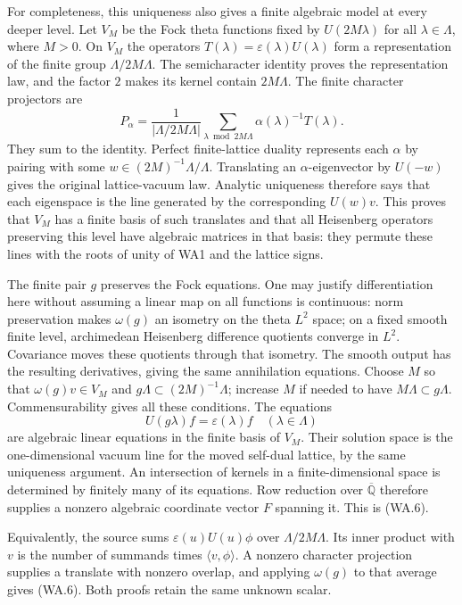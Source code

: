 For completeness, this uniqueness also gives a finite algebraic
model at every deeper level.  Let $V_M$ be the Fock theta functions
fixed by $U(2M\lambda)$ for all $\lambda\in\Lambda$, where $M>0$.
On $V_M$ the operators
$T(\lambda)=\varepsilon(\lambda)U(\lambda)$ form a representation
of the finite group $\Lambda/2M\Lambda$.  The semicharacter identity
proves the representation law, and the factor $2$ makes its kernel
contain $2M\Lambda$.  The finite character projectors are
\[
  P_\alpha=\frac1{|\Lambda/2M\Lambda|}
       \sum_{\lambda\bmod 2M\Lambda}
                          \alpha(\lambda)^{-1}T(\lambda).   \tag{WA.7}
\]
They sum to the identity.  Perfect finite-lattice duality represents
each $\alpha$ by pairing with some
$w\in(2M)^{-1}\Lambda/\Lambda$.  Translating an $\alpha$-eigenvector
by $U(-w)$ gives the original lattice-vacuum law.  Analytic uniqueness
therefore says that each eigenspace is the line generated by the
corresponding $U(w)v$.  This proves that $V_M$ has a finite basis of
such translates and that all Heisenberg operators preserving this
level have algebraic matrices in that basis: they permute these
lines with the roots of unity of WA1 and the lattice signs.

The finite pair $g$ preserves the Fock equations.  One may justify
differentiation here without assuming a linear map on all functions
is continuous: norm preservation makes $\omega(g)$ an isometry on
the theta $L^2$ space; on a fixed smooth finite level, archimedean
Heisenberg difference quotients converge in $L^2$.  Covariance moves
these quotients through that isometry.  The smooth output has the
resulting derivatives, giving the same annihilation equations.
Choose $M$ so that $\omega(g)v\in V_M$ and
$g\Lambda\subset(2M)^{-1}\Lambda$; increase $M$ if needed to have
$M\Lambda\subset g\Lambda$.  Commensurability gives all these
conditions.  The equations
\[
             U(g\lambda)f=\varepsilon(\lambda)f
                         \quad(\lambda\in\Lambda)          \tag{WA.8}
\]
are algebraic linear equations in the finite basis of $V_M$.
Their solution space is the one-dimensional vacuum line for the
moved self-dual lattice, by the same uniqueness argument.  An
intersection of kernels in a finite-dimensional space is determined
by finitely many of its equations.  Row reduction over
$\overline{\mathbb Q}$ therefore supplies a nonzero algebraic
coordinate vector $F$ spanning it.  This is (WA.6).

Equivalently, the source sums $\varepsilon(u)U(u)\phi$ over
$\Lambda/2M\Lambda$.  Its inner product with $v$ is the number of
summands times $\langle v,\phi\rangle$.  A nonzero character
projection supplies a translate with nonzero overlap, and applying
$\omega(g)$ to that average gives (WA.6).  Both proofs retain the
same unknown scalar.

